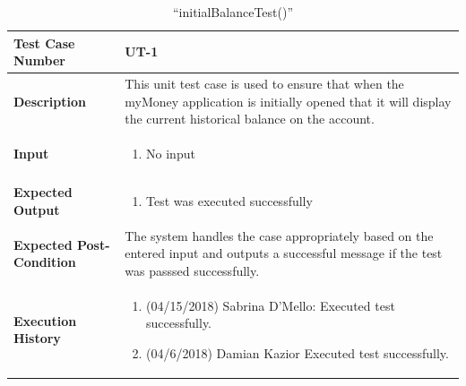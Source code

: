 \documentclass[12pt]{article}
\begin{document}
\begin{table}[H]
\caption{“initialBalanceTest()”}
\begin{center}
\begin{tabular}{|p{5.5cm}|p{11cm}|}
  \hline
  \bf Test Case Number & UT-1\\\hline
  \bf Description & 
  This unit test case is used to ensure that when the myMoney application is initially opened that it will display the current historical balance on the account.\\\hline
  \bf Input &
  \begin{enumerate}
  \item No input
  \end{enumerate}
  \\\hline
  \bf Expected Output &
  \begin{enumerate}
  \item Test was executed successfully
  \end{enumerate}
  \\\hline
  \bf Expected Post-Condition & 
  The system handles the case appropriately based on the entered input and outputs a successful message if the test was passsed successfully.
  \\\hline   
  \bf Execution History & 
  \begin{enumerate}
  \item (04/15/2018) Sabrina D’Mello: Executed test successfully.
  \item (04/6/2018) Damian Kazior Executed test successfully.
  \end{enumerate}
  \\\hline
\end{tabular}
\end{center}
\end{table}
\end{document}
